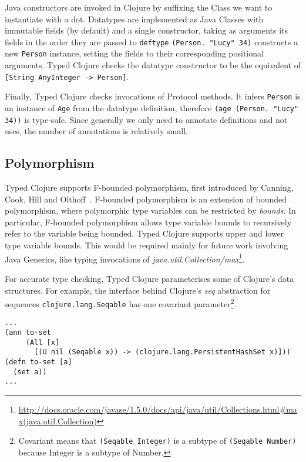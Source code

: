 Java constructors are invoked in Clojure by suffixing the Class we want to instantiate with a dot.
Datatypes are implemented as Java Classes with immutable fields (by default) and a single constructor, taking as arguments its fields 
in the order they are passed to \lstinline|deftype|
\lstinline|(Person. "Lucy" 34)| constructs a new \lstinline|Person|
instance, setting the fields to their corresponding positional arguments.
Typed Clojure checks the datatype constructor to be the equivalent of 
\lstinline|[String AnyInteger -> Person]|.

Finally, Typed Clojure checks invocations of Protocol methods. It infers \lstinline|Person|
is an instance of \lstinline|Age| from the datatype definition, therefore \lstinline|(age (Person. "Lucy" 34))| is type-safe.
Since generally we only need to annotate definitions and not uses, the number of annotations is relatively small.

\subsection{Polymorphism}

Typed Clojure supports F-bounded polymorphism, first introduced by Canning, Cook, Hill and Olthoff~\cite{CCHOM89}. 
F-bounded polymorphism is an extension of bounded polymorphism, where polymorphic type variables
can be restricted by \emph{bounds}.
In particular, F-bounded polymorphism allows type variable bounds to recursively refer to the
variable being bounded. Typed Clojure supports upper and lower type variable bounds.
This would be required mainly for future work involving Java Generics, like typing
invocations of \emph{java.util.Collection/max}\footnote{\url{http://docs.oracle.com/javase/1.5.0/docs/api/java/util/Collections.html#max(java.util.Collection)}}.

For accurate type checking, Typed Clojure parameterises some of Clojure's data structures. For example,
the interface behind Clojure's \emph{seq} abstraction for sequences \lstinline|clojure.lang.Seqable| has one 
covariant parameter\footnote{Covariant means that \lstinline|(Seqable Integer)| is a subtype of \lstinline|(Seqable Number)|
because Integer is a subtype of Number.}.

\begin{lstlisting}[caption=Polymorphism in Typed Clojure]
...
(ann to-set 
     (All [x]
       [(U nil (Seqable x)) -> (clojure.lang.PersistentHashSet x)]))
(defn to-set [a]
  (set a))
...
\end{lstlisting}

